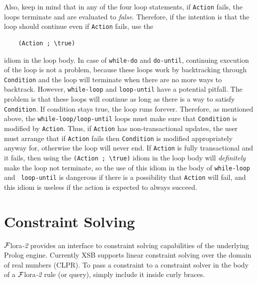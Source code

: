 \documentclass[11pt]{article}
\newcommand{\FLORA}{{\mbox{\sc ${\cal F}${lora}\rm\emph{-2}}}\xspace}
\newcommand{\FLSYSTEM}{\FLORA}
\newcommand{\bs}{\textbackslash}
\begin{document}
Also, keep in mind that in any of the four loop statements, if {\tt Action}
fails, the loops terminate and are evaluated to \emph{false}. Therefore,
if the intention is that the loop should continue even if {\tt Action}
fails, use the
\begin{verbatim}
    (Action ; \true)  
\end{verbatim}
idiom in the loop body. In case of {\tt while-do} and {\tt do-until},
continuing execution of the loop is not a problem, because these loops work
by backtracking through {\tt Condition} and the loop will terminate when
there are no more ways to backtrack. However, {\tt while-loop}
and {\tt loop-until}  have a potential pitfall. The problem is that
these loops will continue as long as there is a way to satisfy {\tt
  Condition}.  If condition stays true, the loop runs forever.
Therefore, as mentioned above, the \texttt{while-loop/loop-until}
loops must make sure that {\tt Condition}
is modified by {\tt Action}. Thus, if {\tt Action} has non-transactional updates,
the user must arrange that if {\tt Action} fails then {\tt Condition} is
modified appropriately anyway for, otherwise the loop will never end.
If {\tt Action} is fully transactional and it fails, then using the
{\tt (Action ; \bs{}true)} idiom in the loop body will \emph{definitely} make the loop
not terminate, so the use of this idiom in the body of {\tt while-loop} and {\tt
  loop-until} is dangerous if there is a possibility that {\tt Action} will
fail, and this idiom is useless if the action is expected to always succeed.



\section{Constraint Solving}\label{sec-clp}

\FLSYSTEM provides an interface to constraint solving capabilities of the
underlying Prolog engine. Currently XSB supports linear constraint solving
over the domain of real numbers (CLPR).
To pass a constraint to a constraint solver in the body of a \FLSYSTEM
rule (or query), simply include it inside curly braces.
\end{document}
